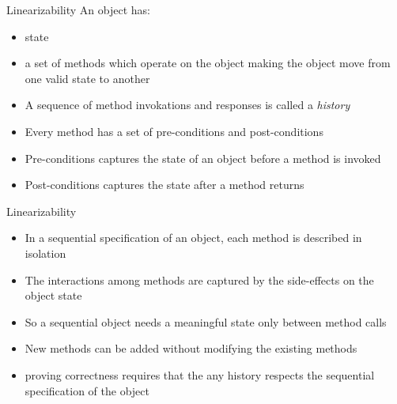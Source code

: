 \ifdefined\LONG
\begin{frame}{Linearizability}
An object has:
\begin{itemize}
\item state
\item a set of methods which operate on the object making the object move from one valid state to another
\end{itemize}
\begin{itemize}
\item A sequence of method invokations and responses is called a \emph{history}
\item Every method has a set of pre-conditions and post-conditions
\item Pre-conditions captures the state of an object before a method is invoked
\item Post-conditions captures the state after a method returns
\end{itemize}
\end{frame}

\begin{frame}{Linearizability}
\begin{itemize}
\item In a sequential specification of an object, each method is described in isolation
\item The interactions among methods are captured by the side-effects on the object state
\item So a sequential object needs a meaningful state only between method calls
\item New methods can be added without modifying the existing methods
\item proving correctness requires that the any history respects the sequential specification of the object
\end{itemize}
\end{frame}

